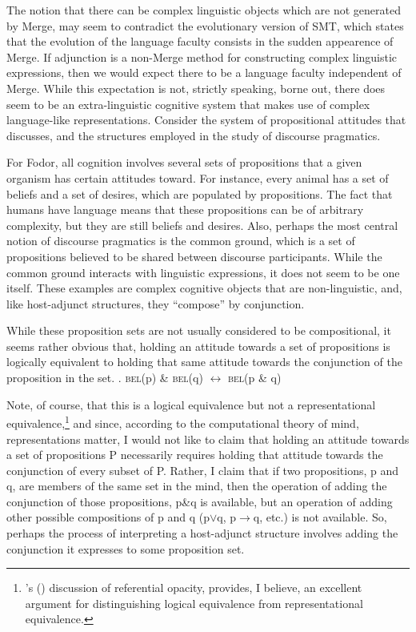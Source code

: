 \documentclass[MilwayThesis]{subfiles}
\begin{document}
The notion that there can be complex linguistic objects which are not generated by Merge, may seem to contradict the evolutionary version of SMT, which states that the evolution of the language faculty consists in the sudden appearence of Merge.
If adjunction is a non-Merge method for constructing complex linguistic expressions, then we would expect there to be a language faculty independent of Merge.
While this expectation is not, strictly speaking, borne out, there does seem to be an extra-linguistic cognitive system that makes use of complex language-like representations.
Consider the system of propositional attitudes that \textcite{fodor1975language} discusses, and the structures employed in the study of discourse pragmatics.

For Fodor, all cognition involves several sets of propositions that a given organism has certain attitudes toward.
For instance, every animal has a set of beliefs and a set of desires, which are populated by propositions.
The fact that humans have language means that these propositions can be of arbitrary complexity, but they are still beliefs and desires.
Also, perhaps the most central notion of discourse pragmatics is the common ground, which is a set of propositions believed to be shared between discourse participants.
While the common ground interacts with linguistic expressions, it does not seem to be one itself.
These examples are complex cognitive objects that are non-linguistic, and, like host-adjunct structures, they ``compose'' by conjunction.

While these proposition sets are not usually considered to be compositional, it seems rather obvious that, holding an attitude towards a set of propositions is logically equivalent to holding that same attitude towards the conjunction of the proposition in the set.
\ex. \textsc{bel}(p) \& \textsc{bel}(q) $\leftrightarrow$ \textsc{bel}(p \& q)

Note, of course, that this is a logical equivalence but not a representational equivalence,\footnote{
	\citeauthor{fodor1975language}'s (\citeyear[50--100]{fodor2010lot}) discussion of referential opacity, provides, I believe, an excellent argument for distinguishing logical equivalence from representational equivalence.
} and since, according to the computational theory of mind, representations matter, I would not like to claim that holding an attitude towards a set of propositions P necessarily requires holding that attitude towards the conjunction of every subset of P.
Rather, I claim that if two propositions, p and q, are members of the same set in the mind, then the operation of adding the conjunction of those propositions, p\&q is available, but an operation of adding other possible compositions of p and q (p$\vee$q, p$\rightarrow$q, etc.) is not available.
So, perhaps the process of interpreting a host-adjunct structure involves adding the conjunction it expresses to some proposition set.
\end{document}
